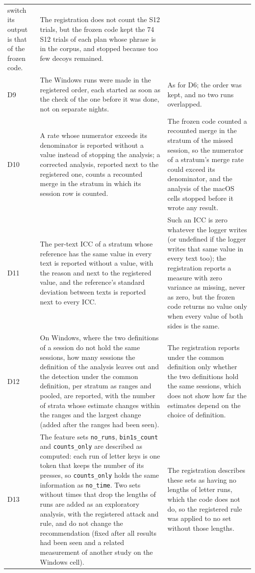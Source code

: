 {\begin{longtable}{L{0.08}L{0.46}L{0.46}}
switch its output is that of the frozen code. &
The registration does not count the S12 trials, but the frozen code kept the 74 S12 trials of each plan whose phrase
is in the corpus, and stopped because too few decoys remained. \\
D9 & The Windows runs were made in the registered order, each started as soon as the check of the one before it was
done, not on separate nights. &
As for D6; the order was kept, and no two runs overlapped. \\
D10 & A rate whose numerator exceeds its denominator is reported without a value instead of stopping the analysis;
a corrected analysis, reported next to the registered one, counts a recounted merge in the stratum in which its
session row is counted. &
The frozen code counted a recounted merge in the stratum of the missed session, so the numerator of a stratum's
merge rate could exceed its denominator, and the analysis of the macOS cells stopped before it wrote any result. \\
D11 & The per-text ICC of a stratum whose reference has the same value in every text is reported without a value, with
the reason and next to the registered value, and the reference's standard deviation between texts is reported next to
every ICC. &
Such an ICC is zero whatever the logger writes (or undefined if the logger writes that same value in every text too); the
registration reports a measure with zero variance as missing, never as zero, but the frozen code returns no value only
when every value of both sides is the same. \\
D12 & On Windows, where the two definitions of a session do not hold the same sessions, how many sessions the
definition of the analysis leaves out and the detection under the common definition, per stratum as ranges and pooled,
are reported, with the number of strata whose estimate changes within the ranges and the largest change (added after
the ranges had been seen). &
The registration reports under the common definition only whether the two definitions hold the same sessions, which
does not show how far the estimates depend on the choice of definition. \\
D13 & The feature sets \texttt{no\_runs}, \texttt{bin1s\_count} and \texttt{counts\_only} are described as computed:
each run of letter keys is one token that keeps the number of its presses, so \texttt{counts\_only} holds the same
information as \texttt{no\_time}. Two sets without times that drop the lengths of runs are added as an exploratory
analysis, with the registered attack and rule, and do not change the recommendation (fixed after all results had been
seen and a related measurement of another study on the Windows cell). &
The registration describes these sets as having no lengths of letter runs, which the code does not do, so the
registered rule was applied to no set without those lengths. \\
\bottomrule
\end{longtable}
}
